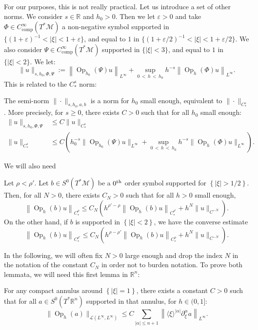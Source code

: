 \documentclass[AHL,Unicode,longabstracts,published]{cedram}
\newcommand{\R}{\mathbb{R}}
\newcommand{\eps}{\varepsilon}
\newcommand{\mc}{\mathcal}
\newcommand{\M}{\mathcal{M}}
\newcommand{\comp}{\mathrm{comp}}
\DeclareMathOperator{\Op}{Op}
\begin{document}
For our purposes, this is not really practical. Let us introduce a set of other norms. We consider $s\in \R$ and $h_0>0$. Then we let $\eps>0$ and take $\Phi \in C^\infty_{\comp}(T^*\M)$ a non-negative symbol supported in $\{(1+\eps)^{-1} <|\xi|< 1+\eps\}$, and equal to $1$ in $\{ (1+\eps/2)^{-1} < |\xi|< 1+\eps/2\}$. We also consider $\Psi \in C^\infty_{\comp}(T^*\M)$ supported in $\{ |\xi|< 3\}$, and equal to $1$ in $\{ |\xi|<2\}$. We let:
\[
\| u \|_{s,h_0,\Phi,\Psi} := \left\| \Op_{h_0}(\Psi) u \right\|_{L^\infty} + \sup_{0\,<\,h\,<\,h_0} h^{-s}\left\|\Op_h(\Phi)u\right\|_{L^\infty}.
\]
This is related to the $C^s_\ast$ norm:

\begin{lemm}\label{lemma:comparaison-norm}
The semi-norm $\| \cdot \|_{s,h_0,a,b}$ is a norm for $h_0$ small enough, equivalent to $\|\cdot\|_{C^s_\ast}$. More precisely, for $s\geq 0$, there exists $C > 0$ such that for all $h_0$ small enough:
\begin{align*}
\| u \|_{s,h_0,\Phi,\Psi} &\leq C \| u \|_{C^s_\ast} \\
\| u \|_{C^s_\ast} &\leq C \left(h_0^{-s}\| \Op_{h_0}(\Psi) u \|_{L^\infty} + \sup_{0\,<\,h\,<\,h_0} h^{-s}\|\Op_h(\Phi)u\|_{L^\infty}\right).
\end{align*}
\end{lemm}

We will also need

\begin{lemm}\label{lemma:comparaison-rho-rho'}
Let $\rho < \rho'$. Let $b \in S^0(T^*\M)$ be a $0^{\rm th}$ order symbol supported for $\left\{|\xi|>1/2\right\}$. Then, for all $N > 0$, there exists $C_N > 0$ such that for all $h>0$ small enough,
\[
\left\| \Op_h(b) u \right\|_{C^{\rho}_\ast} \leq C_N \left(h^{\rho'-\rho} \left\| \Op_h(b) u \right\|_{C^{\rho'}_\ast} + h^N \|u\|_{C^{-N}}\right).
\]
On the other hand, if $b$ is supported in $\left\{|\xi|<2\right\}$, we have the converse estimate
\[
\left\| \Op_h(b) u \right\|_{C^{\rho'}_\ast} \leq C_N \left(h^{\rho-\rho'} \left\| \Op_h(b) u \right\|_{C^{\rho}_\ast} + h^N \|u\|_{C^{-N}}\right).
\]
\end{lemm}

In the following, we will often fix $N > 0$ large enough and drop the index $N$ in the notation of the constant $C_N$ in order not to burden notation. To prove both lemmata, we will need this first lemma in $\R^n$:

\begin{lemm}\label{lemma:boundedness-phi}
For any compact annulus around $\left\{|\xi|=1\right\}$, there exists a constant $C > 0$ such that for all $a \in S^0(T^*\R^n)$ supported in that annulus, for $h\in(0,1]$:
\[
\|\Op_h(a)\|_{\mc{L}\left(L^\infty,L^\infty\right)} \leq C \sum_{|\alpha| \leq n +1} \left\|\langle \xi \rangle^{|\alpha|} \partial^\alpha_\xi a\right\|_{L^\infty}.
\]
\end{lemm}
\end{document}
